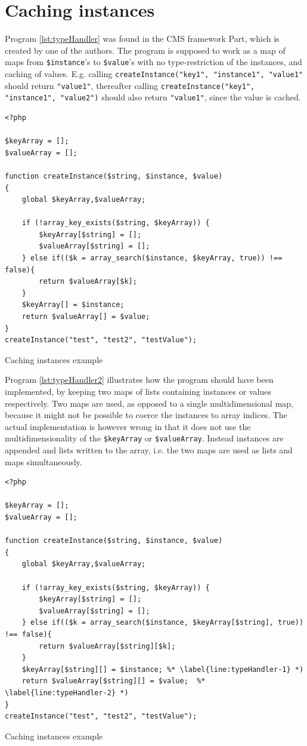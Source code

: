 \newpage
\section{Caching instances}
Program \ref{lst:typeHandler} was found in the CMS framework Part, which is created by one of the authors. The program is supposed to work as a map of maps from \texttt{\$instance}'s to \texttt{\$value}'s with no type-restriction of the instances, and caching of values. E.g. calling \texttt{createInstance("key1", "instance1", "value1"}  should return \texttt{"value1"}, thereafter calling \texttt{createInstance("key1", "instance1", "value2")} should also return \texttt{"value1"}, since the value is cached.

\begin{program}
\begin{lstlisting}
<?php

$keyArray = [];
$valueArray = [];

function createInstance($string, $instance, $value)
{
    global $keyArray,$valueArray;

    if (!array_key_exists($string, $keyArray)) {
        $keyArray[$string] = [];
        $valueArray[$string] = [];
    } else if(($k = array_search($instance, $keyArray, true)) !== false){
        return $valueArray[$k];
    }
    $keyArray[] = $instance;
    return $valueArray[] = $value;
}
createInstance("test", "test2", "testValue");
\end{lstlisting}
\caption{Caching instances example}
\label{lst:typeHandler}
\end{program}



Program \ref{lst:typeHandler2} illustrates how the program should have been implemented, by keeping two maps of lists containing instances or values respectively. Two maps are used, as opposed to a single multidimensional map, because it might not be possible to coerce the instances to array indices. The actual implementation is however wrong in that it does not use the multidimensionality of the \texttt{\$keyArray} or \texttt{\$valueArray}. Instead instances are appended and lists written to the array, i.e. the two maps are used as lists and maps simultaneously. 



\begin{program}
\begin{lstlisting}
<?php

$keyArray = [];
$valueArray = [];

function createInstance($string, $instance, $value)
{
    global $keyArray,$valueArray;

    if (!array_key_exists($string, $keyArray)) {
        $keyArray[$string] = [];
        $valueArray[$string] = [];
    } else if(($k = array_search($instance, $keyArray[$string], true)) !== false){
        return $valueArray[$string][$k];
    }
    $keyArray[$string][] = $instance; %* \label{line:typeHandler-1} *)
    return $valueArray[$string][] = $value;  %* \label{line:typeHandler-2} *)
}
createInstance("test", "test2", "testValue");
\end{lstlisting}
\caption{Caching instances example}
\label{lst:typeHandler2}
\end{program}


